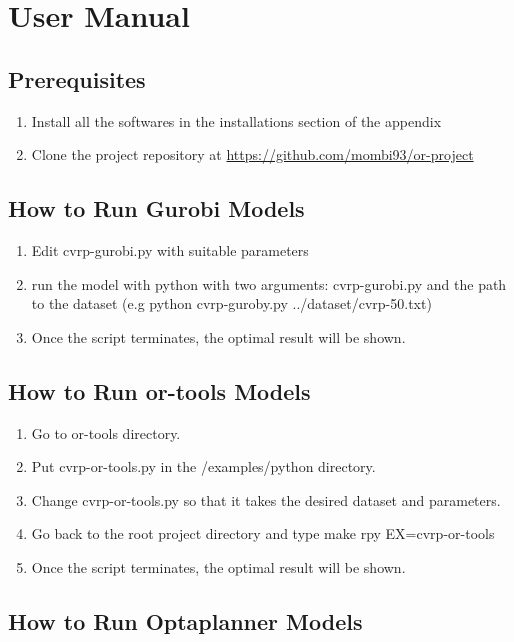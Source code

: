 \chapter{User Manual}
\section{Prerequisites}
\begin{enumerate}
    \item Install all the softwares in the installations section of the appendix
    \item Clone the project repository at \url{https://github.com/mombi93/or-project}
\end{enumerate}

\section{How to Run Gurobi Models}
\begin{enumerate}
    \item Edit cvrp-gurobi.py with suitable parameters
    \item run the model with python with two arguments: cvrp-gurobi.py and the path to the dataset
    (e.g python cvrp-guroby.py ../dataset/cvrp-50.txt)
    \item Once the script terminates, the optimal result will be shown.
\end{enumerate}

\section{How to Run or-tools Models}
\begin{enumerate}
    \item Go to or-tools directory.
    \item Put cvrp-or-tools.py in the /examples/python directory.
    \item Change cvrp-or-tools.py so that it takes the desired dataset and parameters.
    \item Go back to the root project directory and type make rpy EX=cvrp-or-tools
    \item Once the script terminates, the optimal result will be shown.
\end{enumerate}

\section{How to Run Optaplanner Models}

